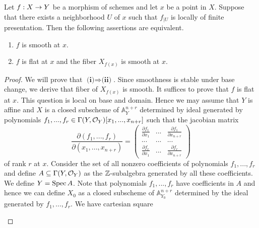 \begin{theorem}
Let $f:X\rightarrow Y$ be a morphism of schemes and let $x$ be a point in $X$. Suppose that there exists a neighborhood $U$ of $x$ such that $f_{\mid U}$ is locally of finite presentation. Then the following assertions are equivalent.
\begin{enumerate}[label=\emph{\textbf{(\roman*)}}, leftmargin=3.0em]
\item $f$ is smooth at $x$.
\item $f$ is flat at $x$ and the fiber $X_{f(x)}$ is smooth at $x$.
\end{enumerate}
\end{theorem}
\begin{proof}
We will prove that $\textbf{(i)}\Rightarrow \textbf{(ii)}$. Since smoothness is stable under base change, we derive that fiber of $X_{f(x)}$ is smooth. It suffices to prove that $f$ is flat at $x$. This question is local on base and domain. Hence we may assume that $Y$ is affine and $X$ is a closed subscheme of $\mathbb{A}^{n+r}_Y$ determined by ideal generated by polynomials $f_1,...,f_r\in \Gamma(Y,{\mathcal O}_Y)[x_1,...,x_{n+r}]$ such that the jacobian matrix
$$\frac{\partial(f_1,...,f_r)}{\partial(x_1,...,x_{n+r})}= \left( \begin{array}{ccc}
\frac{\partial f_1}{\partial x_1} & ... & \frac{\partial f_1}{\partial x_{n+r}} \\
... &...  &...  \\
\frac{\partial f_r}{\partial x_{1}} &...  & \frac{\partial f_r}{\partial x_{n+r}}\end{array} \right)$$
of rank $r$ at $x$. Consider the set of all nonzero coefficients of polynomials $f_1,...,f_r$ and define $A \subseteq \Gamma(Y,{\mathcal O}_Y)$ as the ${\mathbb Z}$-subalgebra generated by all these coefficients. We define $Y = \mathrm{Spec}\, A$. Note that polynomials $f_1,...,f_r$ have coefficients in $A$ and hence we can define $X_0$ as a closed subscheme of $\mathbb{A}^{n+r}_{Y_0}$ determined by the ideal generated by $f_1,...,f_r$. We have cartesian square
\begin{center}
\end{center}
\end{proof}

